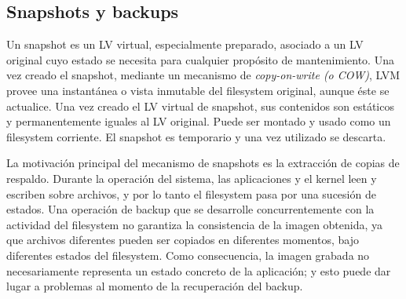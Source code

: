 

\subsection{Snapshots y backups}
\label{sub:snapshots}

Un snapshot es un LV virtual, especialmente preparado, asociado a un LV original cuyo estado se necesita  para cualquier propósito de mantenimiento. Una vez creado el snapshot, mediante un mecanismo de \emph{copy-on-write (o COW)}, LVM provee una instantánea o vista inmutable del filesystem original, aunque éste se actualice. Una vez creado el LV virtual de snapshot, sus contenidos son estáticos y permanentemente iguales al LV original. Puede ser montado y usado como un filesystem corriente. El snapshot es temporario y una vez utilizado se descarta. 

La motivación principal del mecanismo de snapshots es la extracción de copias de respaldo. Durante la operación del sistema, las aplicaciones y el kernel leen y escriben sobre archivos, y por lo tanto el filesystem pasa por una sucesión de estados. Una operación de backup que se desarrolle concurrentemente con la actividad del filesystem no garantiza la consistencia de la imagen obtenida, ya que archivos diferentes pueden ser copiados en diferentes momentos, bajo diferentes estados del filesystem. Como consecuencia, la imagen grabada no necesariamente representa un estado concreto de la aplicación; y esto puede dar lugar a problemas al momento de la recuperación del backup. 

